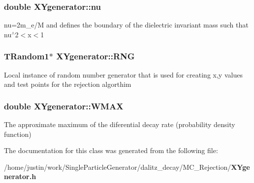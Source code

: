 \subsubsection{\setlength{\rightskip}{0pt plus 5cm}double \bf{XYgenerator::nu}\hspace{0.3cm}{\tt  [private]}}\label{classXYgenerator_f1891c4a4ccaf75a427dba56ac6fa4d2}


nu=2m\_\-e/M and defines the boundary of the dielectric invariant mass such that nu$^\wedge$2$<$x$<$1 
\subsubsection{\setlength{\rightskip}{0pt plus 5cm}TRandom1$\ast$ \bf{XYgenerator::RNG}\hspace{0.3cm}{\tt  [private]}}\label{classXYgenerator_c9581d61e340997d78f9974eb380cac9}


Local instance of random number generator that is used for creating x,y values and test points for the rejection algorthim 
\subsubsection{\setlength{\rightskip}{0pt plus 5cm}double \bf{XYgenerator::WMAX}\hspace{0.3cm}{\tt  [private]}}\label{classXYgenerator_ea8977f81d34d76f2063d8248c2750e0}


The approximate maximum of the diferential decay rate (probability density function) 

The documentation for this class was generated from the following file:\begin{CompactItemize}
\item 
/home/justin/work/Single\-Particle\-Generator/dalitz\_\-decay/MC\_\-Rejection/\bf{XYgenerator.h}\end{CompactItemize}
